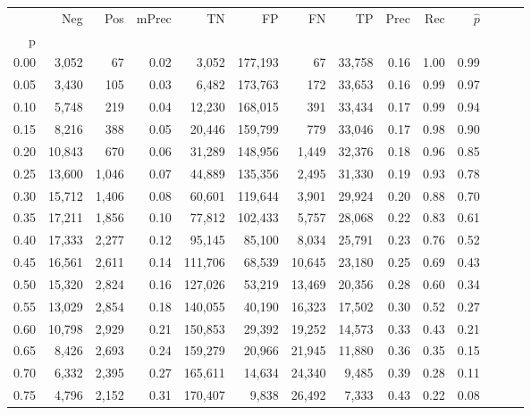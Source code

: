 \begin{tabular}{rrrrrrrrrrrrrr}
\toprule
{} &     Neg &    Pos & mPrec &       TN &       FP &      FN &      TP &  Prec &   Rec & $\hat{p}$ \\
p    &         &        &       &          &          &         &         &       &       &           \\
\midrule
0.00 &   3,052 &     67 &  0.02 &    3,052 &  177,193 &      67 &  33,758 &  0.16 &  1.00 &      0.99 \\
0.05 &   3,430 &    105 &  0.03 &    6,482 &  173,763 &     172 &  33,653 &  0.16 &  0.99 &      0.97 \\
0.10 &   5,748 &    219 &  0.04 &   12,230 &  168,015 &     391 &  33,434 &  0.17 &  0.99 &      0.94 \\
0.15 &   8,216 &    388 &  0.05 &   20,446 &  159,799 &     779 &  33,046 &  0.17 &  0.98 &      0.90 \\
0.20 &  10,843 &    670 &  0.06 &   31,289 &  148,956 &   1,449 &  32,376 &  0.18 &  0.96 &      0.85 \\
0.25 &  13,600 &  1,046 &  0.07 &   44,889 &  135,356 &   2,495 &  31,330 &  0.19 &  0.93 &      0.78 \\
0.30 &  15,712 &  1,406 &  0.08 &   60,601 &  119,644 &   3,901 &  29,924 &  0.20 &  0.88 &      0.70 \\
0.35 &  17,211 &  1,856 &  0.10 &   77,812 &  102,433 &   5,757 &  28,068 &  0.22 &  0.83 &      0.61 \\
0.40 &  17,333 &  2,277 &  0.12 &   95,145 &   85,100 &   8,034 &  25,791 &  0.23 &  0.76 &      0.52 \\
0.45 &  16,561 &  2,611 &  0.14 &  111,706 &   68,539 &  10,645 &  23,180 &  0.25 &  0.69 &      0.43 \\
0.50 &  15,320 &  2,824 &  0.16 &  127,026 &   53,219 &  13,469 &  20,356 &  0.28 &  0.60 &      0.34 \\
0.55 &  13,029 &  2,854 &  0.18 &  140,055 &   40,190 &  16,323 &  17,502 &  0.30 &  0.52 &      0.27 \\
0.60 &  10,798 &  2,929 &  0.21 &  150,853 &   29,392 &  19,252 &  14,573 &  0.33 &  0.43 &      0.21 \\
0.65 &   8,426 &  2,693 &  0.24 &  159,279 &   20,966 &  21,945 &  11,880 &  0.36 &  0.35 &      0.15 \\
0.70 &   6,332 &  2,395 &  0.27 &  165,611 &   14,634 &  24,340 &   9,485 &  0.39 &  0.28 &      0.11 \\
0.75 &   4,796 &  2,152 &  0.31 &  170,407 &    9,838 &  26,492 &   7,333 &  0.43 &  0.22 &      0.08 \\

\end{tabular}
